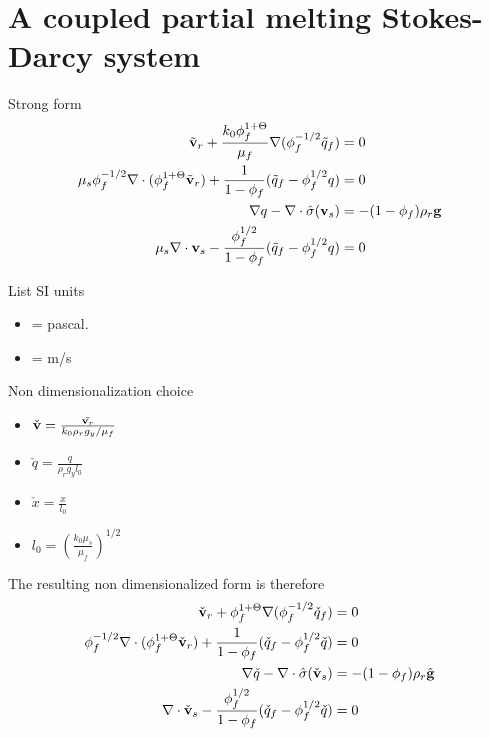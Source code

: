 %
\section{A coupled partial melting Stokes-Darcy system}
Strong form
\begin{equation}
\begin{aligned}
		  \tilde{\bold{v}}_r + \frac{k_0 \phi_f^{1+\Theta}}{\mu_f} \nabla (\phi_f^{-1/2}\tilde{q}_f) &= 0 \\
		  \mu_s\phi_f^{-1/2}\nabla\cdot(\phi_f^{1+\Theta}\tilde{\bold{v}}_r) + \frac{1}{1-\phi_f}(\tilde{q}_f - \phi_f^{1/2}q) &=0\\
		  \nabla q - \nabla \cdot \hat{\sigma}(\bold{v}_s) &= -(1-\phi_f)\rho_r \bold{g} \\
		  \mu_s \nabla \cdot \bold{v}_s - \frac{\phi_f^{1/2}}{1-\phi_f}(\tilde{q}_f - \phi_f^{1/2}q) &=0
\end{aligned}
\end{equation}

List SI units

\begin{itemize}
		  \item [q] = pascal.
		  \item [$\bold{v}$] = m/s
\end{itemize}

Non dimensionalization choice
\begin{itemize}
		  \item $\check{\bold{v}} = \frac{\tilde{\bold{v}_r}}{k_0 \rho_r g_y/\mu_f}$
					 \item $\check{q} = \frac{q}{\rho_r g_y l_0 }$
					 \item $\check{x} = \frac{x}{l_0}$
					 \item $l_0 = (\frac{k_0 \mu_s}{\mu_f})^{1/2}$
\end{itemize}

The resulting non dimensionalized form is therefore
\begin{equation}
		  \begin{aligned}
					 \check{\bold{v}}_r + \phi_f^{1+\Theta}\nabla (\phi_f^{-1/2}\check{q}_f) &= 0\\
					 \phi_f^{-1/2}\nabla \cdot (\phi_f^{1+\Theta} \check{\bold{v}}_r) + \frac{1}{1-\phi_f}(\check{q}_f - \phi_f^{1/2}\check{q}) &=0 \\
					 \nabla \check{q} - \nabla \cdot \hat{\sigma}(\check{\bold{v}}_s) &= -(1-\phi_f)\rho_r \hat{\bold{g}} \\
					 \nabla \cdot \check{\bold{v}}_s - \frac{\phi_f^{1/2}}{1-\phi_f}(\check{q}_f - \phi_f^{1/2}\check{q}) &= 0
		  \end{aligned}
\end{equation}

